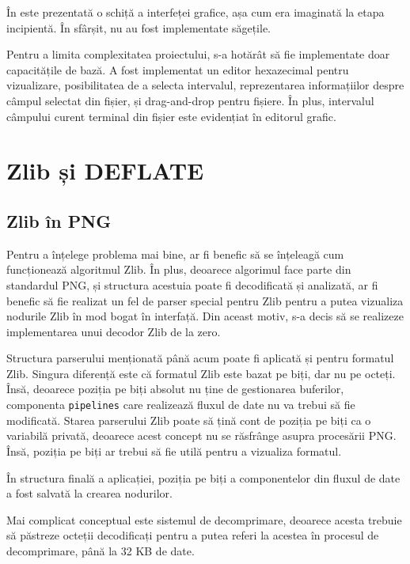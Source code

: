 \documentclass[a4paper,12pt]{report}
\begin{document}
În  este prezentată o schiță a interfeței grafice,
așa cum era imaginată la etapa incipientă.
În sfârșit, nu au fost implementate săgețile.


Pentru a limita complexitatea proiectului, s-a hotărât să fie implementate doar capacitățile de bază.
A fost implementat un editor hexazecimal pentru vizualizare, posibilitatea de a selecta intervalul,
reprezentarea informațiilor despre câmpul selectat din fișier, și drag-and-drop pentru fișiere.
În plus, intervalul câmpului curent terminal din fișier este evidențiat în editorul grafic.

\section{Zlib și DEFLATE}

\subsection{Zlib în \ac{PNG}}

Pentru a înțelege problema mai bine, ar fi benefic să se înțeleagă cum funcționează algoritmul Zlib.
În plus, deoarece algorimul face parte din standardul \ac{PNG},
și structura acestuia poate fi decodificată și analizată,
ar fi benefic să fie realizat un fel de parser special pentru Zlib pentru a putea vizualiza nodurile Zlib
în mod bogat în interfață.
Din aceast motiv, s-a decis să se realizeze implementarea unui decodor Zlib de la zero.

Structura parserului menționată până acum poate fi aplicată și pentru formatul Zlib.
Singura diferență este că formatul Zlib este bazat pe biți, dar nu pe octeți.
Însă, deoarece poziția pe biți absolut nu ține de gestionarea buferilor,
componenta \texttt{pipelines} care realizează fluxul de date nu va trebui să fie modificată.
Starea parserului Zlib poate să țină cont de poziția pe biți ca o variabilă privată, deoarece
acest concept nu se răsfrânge asupra procesării \ac{PNG}.
Însă, poziția pe biți ar trebui să fie utilă pentru a vizualiza formatul.

În structura finală a aplicației, poziția pe biți a componentelor din fluxul de date a fost salvată la crearea nodurilor.

Mai complicat conceptual este sistemul de decomprimare,
deoarece acesta trebuie să păstreze octeții decodificați pentru a putea referi la acestea
în procesul de decomprimare, până la 32 KB de date.
\end{document}
